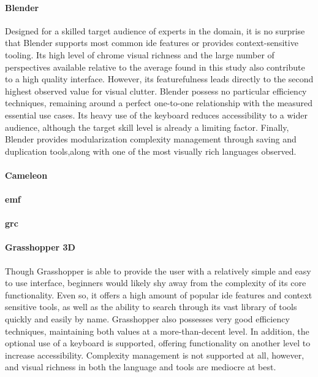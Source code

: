 \paragraph{Blender} Designed for a skilled target audience of experts in
the domain, it is no surprise that Blender supports most common \ac{ide}
features or provides context-sensitive tooling. Its high level of chrome
visual richness and the large number of perspectives available relative to
the average found in this study also contribute to a high quality
interface. However, its featurefulness leads directly to the second highest
observed value for visual clutter. Blender possess no particular efficiency
techniques, remaining around a perfect one-to-one relationship with the
measured essential use cases. Its heavy use of the keyboard reduces
accessibility to a wider audience, although the target skill level is
already a limiting factor. Finally, Blender provides modularization
complexity management through saving and duplication tools,along with one
of the most visually rich languages observed.

\paragraph{Cameleon}

\paragraph{\acl{emf}}

\paragraph{\acl{grc}}

\paragraph{Grasshopper 3D} Though Grasshopper is able to provide the user
with a relatively simple and easy to use interface, beginners would likely
shy away from the complexity of its core functionality. Even so, it offers
a high amount of popular \ac{ide} features and context sensitive tools, as
well as the ability to search through its vast library of tools quickly and
easily by name. Grasshopper also possesses very good efficiency techniques,
maintaining both values at a more-than-decent level. In addition, the
optional use of a keyboard is supported, offering functionality on another
level to increase accessibility. Complexity management is not supported at
all, however, and visual richness in both the language and tools are
mediocre at best.

